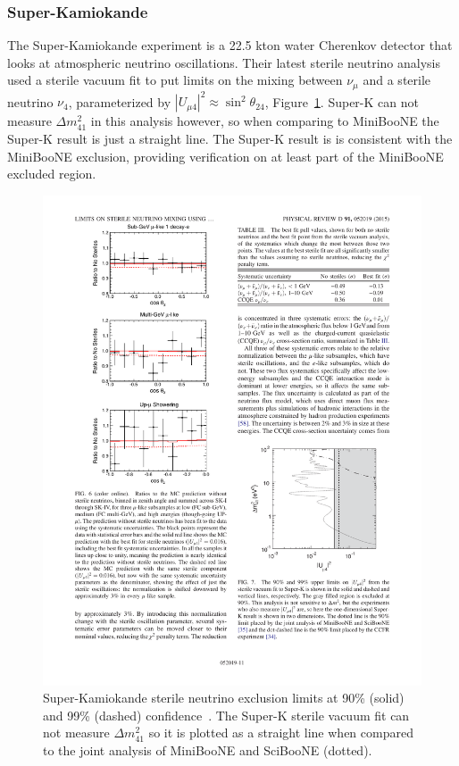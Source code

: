 \documentclass[aps,prd,twocolumn,nofootinbib]{revtex4-1}
\begin{document}
\subsubsection{Super-Kamiokande}
The Super-Kamiokande experiment is a 22.5 kton water Cherenkov detector that looks at atmospheric neutrino oscillations. Their latest sterile neutrino analysis~\cite{SuperK} used a sterile vacuum fit to put limits on the mixing between $\nu_{\mu}$ and a sterile neutrino $\nu_4$, parameterized by $\left|U_{\mu 4}\right|^2 \approx \sin^2 \theta_{24}$, Figure~\ref{fig:SuperK}. Super-K can not measure $\Delta m^{2}_{41}$ in this analysis however, so when comparing to MiniBooNE the Super-K result is just a straight line. The Super-K result is is consistent with the MiniBooNE exclusion, providing verification on at least part of the MiniBooNE excluded region.

\begin{figure}[H]
 \centering
 \includegraphics[width=1\columnwidth]{../figures/sk1.pdf}
 \caption{Super-Kamiokande sterile neutrino exclusion limits at 90\% (solid) and 99\% (dashed) confidence~\cite{SuperK}. The Super-K sterile vacuum fit can not measure $\Delta m^{2}_{41}$ so it is plotted as a straight line when compared to the joint analysis of MiniBooNE and SciBooNE (dotted).}
 \label{fig:SuperK}
\end{figure}
\end{document}
